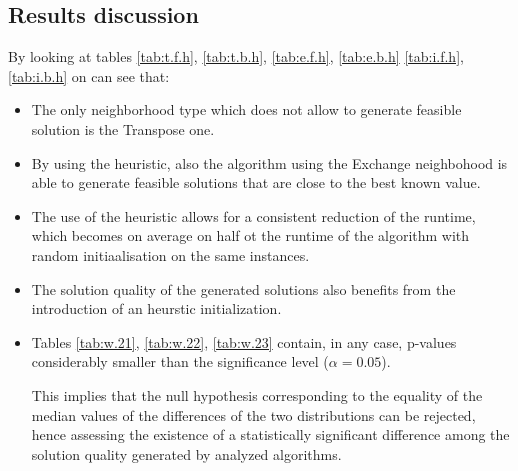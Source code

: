 \subsection{Results discussion}
By looking at tables \ref{tab:t.f.h}, \ref{tab:t.b.h}, \ref{tab:e.f.h}, \ref{tab:e.b.h} \ref{tab:i.f.h}, \ref{tab:i.b.h} on can see that:
\begin{itemize}

\item The only neighborhood type which does not allow to generate feasible solution is the Transpose one.

\item By using the heuristic, also the algorithm using the Exchange neighbohood is able to generate feasible solutions that are close to the best known value.

\item The use of the heuristic allows for a consistent reduction of the runtime, which becomes on average on half ot the runtime of the algorithm with random initiaalisation on the same instances.

\item The solution quality of the generated solutions also benefits from the introduction of an heurstic initialization.

\item Tables \ref{tab:w.21}, \ref{tab:w.22}, \ref{tab:w.23} contain, in any case, p-values considerably smaller than the significance level ($\alpha=0.05$). 

This implies that the null hypothesis corresponding to the equality of the median values of the differences of the two distributions can be rejected, hence assessing the existence of a statistically significant difference among the solution quality generated by analyzed algorithms.


\end{itemize}
